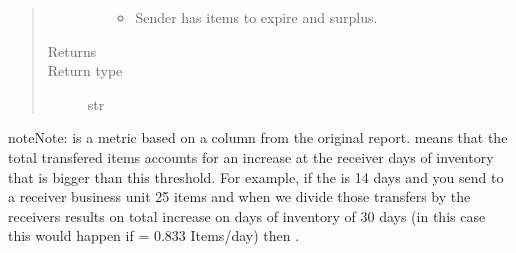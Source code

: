 \documentclass[letterpaper,10pt,english]{sphinxmanual}
\begin{document}
\begin{fulllineitems}
\begin{quote}
\begin{description}
\begin{itemize}
\begin{itemize}
\item {} 
 \sphinxhyphen{} Sender has items to expire and surplus.

\end{itemize}


\end{itemize}

\item[{Returns}] \leavevmode
{}

\item[{Return type}] \leavevmode
str

\end{description}\end{quote}

\begin{sphinxadmonition}{note}{Note:}
 is a metric based on a column from the original report.  means that the total transfered     items accounts for an increase at the receiver days of inventory that is bigger than this  threshold. For example, if the      is 14 days and you send to a receiver business unit 25 items and when we divide those transfers by the receivers  results on total increase on days of inventory     of 30 days (in this case this would happen if  = 0.833 Items/day) then .
\end{sphinxadmonition}

\end{fulllineitems}

\end{document}
